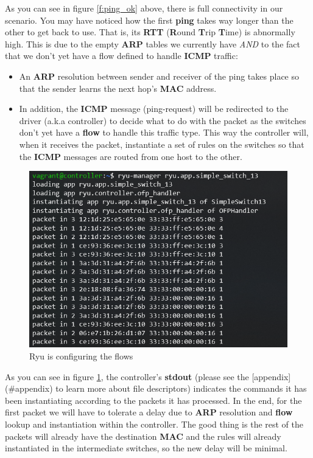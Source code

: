 \documentclass[12pt]{report}
\begin{document}
			As you can see in figure \ref{f:ping_ok} above, there is full connectivity in our scenario. You may have noticed how the first \textbf{ping} takes way longer than the other to get back to use. That is, its \textbf{RTT} (\textbf{R}ound \textbf{T}rip \textbf{T}ime) is abnormally high. This is due to the empty \textbf{ARP} tables we currently have \textit{AND} to the fact that we don't yet have a flow defined to handle \textbf{ICMP} traffic:

			\begin{itemize}
				\item An \textbf{ARP} resolution between sender and receiver of the ping takes place so that the sender learns the next hop's \textbf{MAC} address.
				\item In addition, the \textbf{ICMP} message (ping-request) will be redirected to the driver (a.k.a controller) to decide what to do with the packet as the switches don't yet have a \textbf{flow} to handle this traffic type. This way the controller will, when it receives the packet, instantiate a set of rules on the switches so that the \textbf{ICMP} messages are routed from one host to the other.
			\end{itemize}

			\begin{figure}
				\centering
				\includegraphics[scale = 1]{ryu_rcv.png}
				\caption{Ryu is configuring the flows}
				\label{f:ryu_rcv}
			\end{figure}

			As you can see in figure \ref{f:ryu_rcv}, the controller's \textbf{stdout} (please see the [appendix](#appendix) to learn more about file descriptors) indicates the commands it has been instantiating according to the packets it has processed. In the end, for the first packet we will have to tolerate a delay due to \textbf{ARP} resolution and \textbf{flow} lookup and instantiation within the controller. The good thing is the rest of the packets will already have the destination \textbf{MAC} and the rules will already instantiated in the intermediate switches, so the new delay will be minimal.
\end{document}
